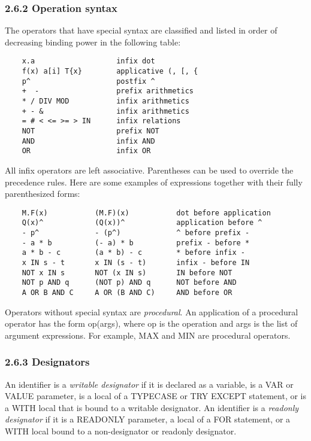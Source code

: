 \documentclass[10pt]{article}
\begin{document}
\subsubsection*{2.6.2 Operation syntax}

The operators that have special syntax are classified and listed in order of
decreasing binding power in the following table:
\begin{verbatim}
    x.a                   infix dot
    f(x) a[i] T{x}        applicative (, [, {
    p^                    postfix ^
    +  -                  prefix arithmetics
    * / DIV MOD           infix arithmetics
    + - &                 infix arithmetics
    = # < <= >= > IN      infix relations
    NOT                   prefix NOT
    AND                   infix AND
    OR                    infix OR
\end{verbatim}

All infix operators are left associative.  Parentheses can be used to override
the precedence rules.  Here are some examples of expressions together with
their fully parenthesized forms:
\begin{verbatim}
    M.F(x)           (M.F)(x)           dot before application
    Q(x)^            (Q(x))^            application before ^
    - p^             - (p^)             ^ before prefix -
    - a * b          (- a) * b          prefix - before *
    a * b - c        (a * b) - c        * before infix -
    x IN s - t       x IN (s - t)       infix - before IN
    NOT x IN s       NOT (x IN s)       IN before NOT
    NOT p AND q      (NOT p) AND q      NOT before AND
    A OR B AND C     A OR (B AND C)     AND before OR
\end{verbatim}

Operators without special syntax are \emph{procedural}.  An application of a
procedural operator has the form op(args), where op is the operation and args
is the list of argument expressions.  For example, MAX and MIN are procedural
operators.

\subsubsection*{2.6.3 Designators}

An identifier is a \emph{writable designator} if it is declared as a variable,
is a VAR or VALUE parameter, is a local of a TYPECASE or TRY EXCEPT statement,
or is a WITH local that is bound to a writable designator.  An identifier is a
\emph{readonly designator} if it is a READONLY parameter, a local of a FOR
statement, or a WITH local bound to a non-designator or readonly designator.
\end{document}
